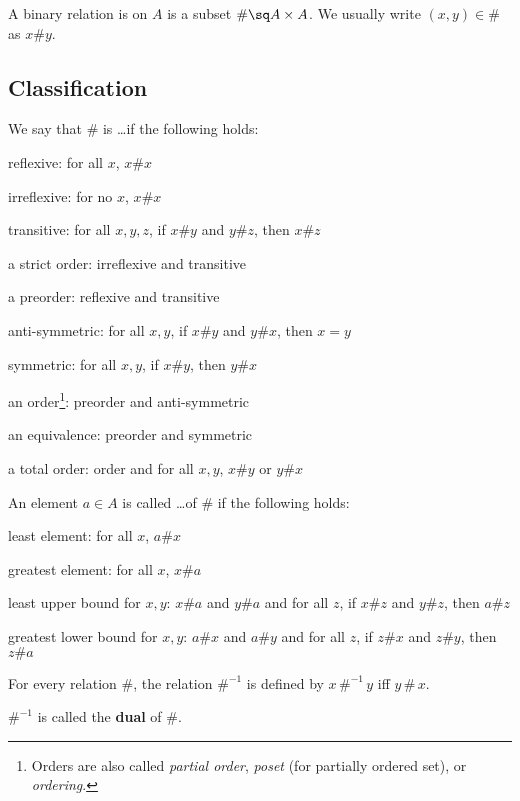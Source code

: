 A binary relation is on $A$ is a subset $\#\sq A\times A$.
We usually write $(x,y)\in\#$ as $x\# y$.

\subsection{Classification}

\begin{definition}\label{def:math:binrel}
We say that $\#$ is \ldots if the following holds:
 \begin{compactitem}
 \item reflexive:  for all $x$, $x\# x$
 \item irreflexive:  for no $x$, $x\# x$
 \item transitive: for all $x,y,z$, if $x\# y$ and $y\# z$, then $x\# z$
 \item a strict order: irreflexive and transitive
 \item a preorder: reflexive and transitive
 \item anti-symmetric: for all $x,y$, if $x\# y$ and $y\# x$, then $x=y$
 \item symmetric: for all $x,y$, if $x\# y$, then $y\# x$
 \item an order\footnote{Orders are also called \emph{partial order}, \emph{poset} (for partially ordered set), or \emph{ordering}.}: preorder and anti-symmetric
 \item an equivalence: preorder and symmetric
 \item a total order: order and for all $x,y$, $x\# y$ or $y\# x$
 \end{compactitem}

An element $a\in A$ is called \ldots of $\#$ if the following holds:
 \begin{compactitem}
  \item least element:  for all $x$, $a\# x$
  \item greatest element: for all $x$, $x\# a$
  \item least upper bound for $x,y$: $x\# a$ and $y\# a$ and for all $z$, if $x\# z$ and $y\# z$, then $a\# z$
  \item greatest lower bound for $x,y$: $a\# x$ and $a\# y$ and for all $z$, if $z\# x$ and $z\# y$, then $z\# a$
 \end{compactitem}
\end{definition}

\begin{definition}
For every relation $\#$, the relation $\#^{-1}$ is defined by $x\,\#^{-1}\, y$ iff $y\,\#\,x$.

$\#^{-1}$ is called the \textbf{dual} of $\#$.
\end{definition}

